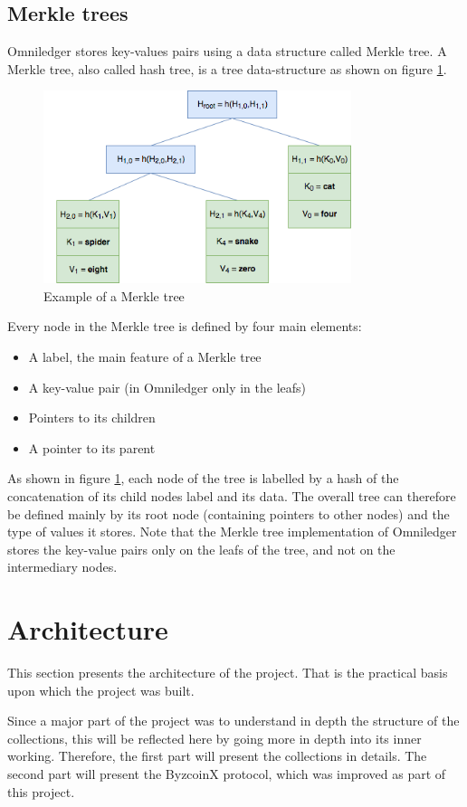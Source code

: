 \documentclass[11pt, a4paper, twoside, openright]{article}
\begin{document}
\subsection{Merkle trees}
\label{merkle_tree}
Omniledger stores key-values pairs using a data structure called Merkle \mbox{tree\cite{Merkle_tree}}. A Merkle tree, also called hash tree, is a tree data-structure as shown on figure \ref{fig:Merkle_tree}.
\begin{figure}
 \centering
  \includegraphics[width=9cm]{merkle_tree.png}
  \caption{Example of a Merkle tree}
  \label{fig:Merkle_tree}
\end{figure}
Every node in the Merkle tree is defined by four main elements:
\begin{itemize}
\itemsep0em
\item A label, the main feature of a Merkle tree
\item A key-value pair (in Omniledger only in the leafs)
\item Pointers to its children
\item A pointer to its parent
\end{itemize}
As shown in figure \ref{fig:Merkle_tree}, each node of the tree is labelled by a hash of the concatenation of its child nodes label and its data. The overall tree can therefore be defined mainly by its root node (containing pointers to other nodes) and the type of values it stores. Note that the Merkle tree implementation of Omniledger stores the key-value pairs only on the leafs of the tree, and not on the intermediary nodes.

\section{Architecture}
This section presents the architecture of the project. That is the practical basis upon which the project was built.

Since a major part of the project was to understand in depth the structure of the collections, this will be reflected here by going more in depth into its inner working. Therefore, the first part will present the collections in details. The second part will present the ByzcoinX protocol, which was improved as part of this project.
\end{document}
